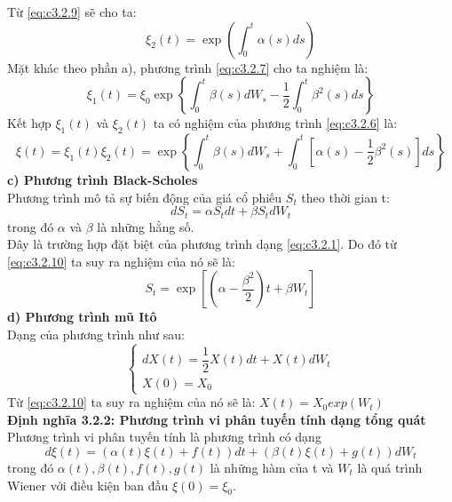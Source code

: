 \documentclass[14pt,a4paper]{article}
\numberwithin{equation}{section}
\begin{document}
Từ \eqref{eq:c3.2.9} sẽ cho ta:
\begin{equation*}
	\xi_2(t)=\exp\left(\int_{0}^{t}\alpha(s)ds \right)
\end{equation*}
Mặt khác theo phần a), phương trình \eqref{eq:c3.2.7} cho ta nghiệm là:
\begin{equation*}
	\xi_1(t)=\xi_0\exp\left\{\int_{0}^{t}\beta(s)dW_s-\dfrac{1}{2}\int_{0}^{t}\beta^2(s)ds \right\}
\end{equation*}
Kết hợp $\xi_1(t)$ và $\xi_2(t)$ ta có nghiệm của phương trình \eqref{eq:c3.2.6} là:
\begin{equation}\label{eq:c3.2.10}
	\xi(t)=\xi_1(t)\xi_2(t)=\exp\left\{\int_{0}^{t}\beta(s)dW_s+\int_{0}^{t}\left[\alpha(s)-\dfrac{1}{2}\beta^2(s) \right]ds\right\}
\end{equation}
\textbf{c) Phương trình Black-Scholes}\\
Phương trình mô tả sự biến động của giá cổ phiếu $S_t$ theo thời gian t:
\begin{equation}\label{eq:c3.2.11}
	dS_t=\alpha S_tdt+\beta S_tdW_t
\end{equation}
trong đó $\alpha$ và $\beta$ là những hằng số.\\
Đây là trường hợp đặt biệt của phương trình dạng \eqref{eq:c3.2.1}. Do đó từ \eqref{eq:c3.2.10} ta suy ra nghiệm của nó sẽ là:
\begin{equation}\label{eq:c3.2.12}
	S_t=\exp\left[\left(\alpha-\dfrac{\beta^2}{2} \right)t+\beta W_t \right]
\end{equation}
\textbf{d) Phương trình mũ Itô}\\
Dạng của phương trình như sau:
\begin{equation}\label{eq:c3.2.13}
	\begin{cases}
		dX(t)=\dfrac{1}{2}X(t)dt+X(t)dW_t\\
		X(0)=X_0
	\end{cases}
\end{equation}
Từ \eqref{eq:c3.2.10} ta suy ra nghiệm của nó sẽ là: $X(t)=X_0exp(W_t)$\\
\textbf{Định nghĩa 3.2.2: Phương trình vi phân tuyến tính dạng tổng quát}\\
Phương trình vi phân tuyến tính là phương trình có dạng
\begin{equation}\label{eq:c3.2.14}
	d\xi(t)=(\alpha(t)\xi(t)+f(t))dt+(\beta(t)\xi(t)+g(t))dW_t
\end{equation}
trong đó $\alpha(t),\beta(t),f(t),g(t)$ là những hàm của t và $W_t$ là quá trình Wiener với điều kiện ban đầu $\xi(0)=\xi_0$.\\
\end{document}
